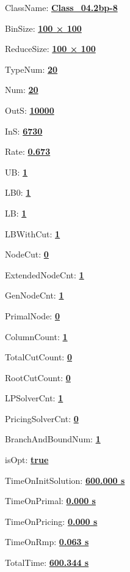 \documentclass[11pt]{article}
\begin{document}
\pagestyle{empty}


ClassName: \underline{\textbf{Class_04.2bp-8}}
\par
BinSize: \underline{\textbf{100 × 100}}
\par
ReduceSize: \underline{\textbf{100 × 100}}
\par
TypeNum: \underline{\textbf{20}}
\par
Num: \underline{\textbf{20}}
\par
OutS: \underline{\textbf{10000}}
\par
InS: \underline{\textbf{6730}}
\par
Rate: \underline{\textbf{0.673}}
\par
UB: \underline{\textbf{1}}
\par
LB0: \underline{\textbf{1}}
\par
LB: \underline{\textbf{1}}
\par
LBWithCut: \underline{\textbf{1}}
\par
NodeCut: \underline{\textbf{0}}
\par
ExtendedNodeCnt: \underline{\textbf{1}}
\par
GenNodeCnt: \underline{\textbf{1}}
\par
PrimalNode: \underline{\textbf{0}}
\par
ColumnCount: \underline{\textbf{1}}
\par
TotalCutCount: \underline{\textbf{0}}
\par
RootCutCount: \underline{\textbf{0}}
\par
LPSolverCnt: \underline{\textbf{1}}
\par
PricingSolverCnt: \underline{\textbf{0}}
\par
BranchAndBoundNum: \underline{\textbf{1}}
\par
isOpt: \underline{\textbf{true}}
\par
TimeOnInitSolution: \underline{\textbf{600.000 s}}
\par
TimeOnPrimal: \underline{\textbf{0.000 s}}
\par
TimeOnPricing: \underline{\textbf{0.000 s}}
\par
TimeOnRmp: \underline{\textbf{0.063 s}}
\par
TotalTime: \underline{\textbf{600.344 s}}
\par
\newpage
\end{document}

